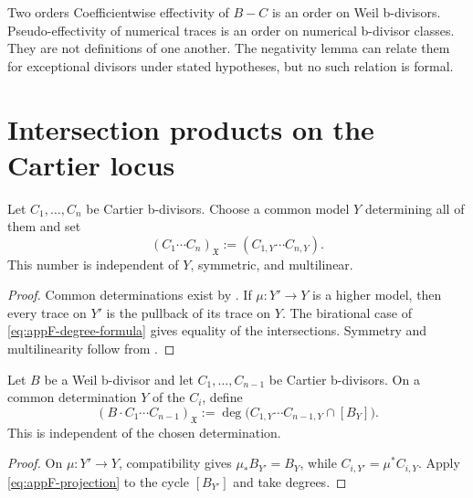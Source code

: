 \begin{warning}{Two orders}
\label{warn:appF-two-orders}
Coefficientwise effectivity of \(B-C\) is an order on Weil b-divisors.
Pseudo-effectivity of numerical traces is an order on numerical b-divisor
classes.
They are not definitions of one another.
The negativity lemma can relate them for exceptional divisors under stated
hypotheses, but no such relation is formal.
\end{warning}

\section{Intersection products on the Cartier locus}
\label{sec:appF-bdivisor-intersection}

\begin{theorem}\label{thm:appF-cartier-bdivisor-intersection}
Let \(C_1,\ldots,C_n\) be Cartier b-divisors.
Choose a common model \(Y\) determining all of them and set
\[
                         (C_1\cdots C_n)_{\mathfrak X}
                         :=(C_{1,Y}\cdots C_{n,Y}).
\tag{F.10}\label{eq:appF-cartier-bdivisor-product}
\]
This number is independent of \(Y\), symmetric, and multilinear.
\end{theorem}

\begin{proof}
Common determinations exist by
.
If \(\mu:Y'\to Y\) is a higher model, then every trace on \(Y'\) is the
pullback of its trace on \(Y\).
The birational case of
\eqref{eq:appF-degree-formula} gives equality of the intersections.
Symmetry and multilinearity follow from
.
\end{proof}

\begin{proposition}\label{prop:appF-one-weil-factor}
Let \(B\) be a Weil b-divisor and let
\(C_1,\ldots,C_{n-1}\) be Cartier b-divisors.
On a common determination \(Y\) of the \(C_i\), define
\[
 (B\cdot C_1\cdots C_{n-1})_{\mathfrak X}
 :=
 \deg\bigl(
 C_{1,Y}\cdots C_{n-1,Y}\cap[B_Y]
 \bigr).
\tag{F.11}\label{eq:appF-one-weil-product}
\]
This is independent of the chosen determination.
\end{proposition}

\begin{proof}
On \(\mu:Y'\to Y\), compatibility gives
\(\mu_*B_{Y'}=B_Y\), while \(C_{i,Y'}=\mu^*C_{i,Y}\).
Apply \eqref{eq:appF-projection} to the cycle \([B_{Y'}]\) and take degrees.
\end{proof}

